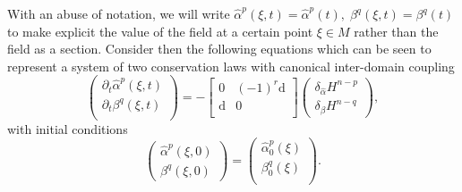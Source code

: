 \documentclass{elsarticle}
\newcommand{\revTwo}[1]{{\color{black}#1}}
\renewcommand\d{\ensuremath{\mathrm{d}}}
\newcommand*{\dual}[1]{\ensuremath{\widehat{#1}}}
\begin{document}
With an abuse of notation, we will write \revTwo{$\dual{\alpha}^p(\xi, t)= \dual{\alpha}^p(t), \; \beta^q(\xi, t) = \beta^q(t)$} to make explicit the value of the field at a certain point $\xi\in M$ rather than the field as a section. Consider then the following equations which can be seen to represent a system of two conservation laws with canonical inter-domain coupling \cite{vanderSchaft2002}
\begin{equation}\label{eq:pHsys}
    \begin{pmatrix}
        \partial_t \dual{\alpha}^p(\xi, t) \\
        \partial_t \beta^{q}(\xi, t) \\
    \end{pmatrix} = -
    \begin{bmatrix}
    0 & (-1)^r \d \\
    \d & 0 \\
    \end{bmatrix}
    \begin{pmatrix}
        \delta_{\dual{\alpha}} H^{n-p} \\
        \delta_{\beta} H^{n-q}
    \end{pmatrix}, 
\end{equation}
with initial conditions
\begin{equation}
    \begin{pmatrix}
        \dual{\alpha}^p(\xi, 0) \\
        \beta^{q}(\xi, 0)
    \end{pmatrix} = 
    \begin{pmatrix}
        \dual{\alpha}^p_0(\xi) \\
        \beta^{q}_0(\xi) \\
    \end{pmatrix}.
\end{equation}
\end{document}
